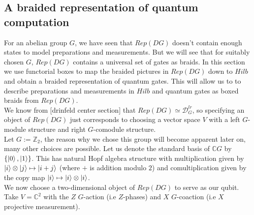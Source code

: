 \documentclass{article}
\begin{document}
\subsection{A braided representation of quantum computation}
For an abelian group $G$, we have seen that $Rep(DG)$ doesn't contain enough states to model preparations and measurements. But we will see that for suitably chosen $G$, $Rep(DG)$ contains a universal set of gates as braids. In this section we use functorial boxes \cite{Mellies06} to map the braided pictures in $Rep(DG)$ down to $Hilb$ and obtain a braided representation of quantum gates. This will allow us to to describe preparations and measurements in $Hilb$ and quantum gates as boxed braids from $Rep(DG)$.\\
We know from [drinfeld center section] that $Rep(DG) \simeq \mathcal{D}_G^{lr}$, so specifying an object of $Rep(DG)$ just corresponds to choosing a vector space $V$ with a left $G$-module structure  and right $G$-comodule structure.\\
Let $G:= \mathbb{Z}_2$, the reason why we chose this group will become apparent later on, many other choices are possible. Let us denote the standard basis of $\mathbb{C}G$ by $\{ \ket{0}, \ket{1}\}$. This has natural Hopf algebra structure with multiplication given by $\ket{i}\otimes \ket{j} \mapsto \ket{i+j}$ (where $+$ is addition modulo $2$) and comultiplication given by the copy map $\ket{i} \mapsto \ket{i}\otimes \ket{i} $.\\
We now choose a two-dimensional object of $Rep(DG)$ to serve as our qubit. Take $V=\mathbb{C}^2$ with the $Z$ $G$-action (i.e $Z$-phases) and $X$ $G$-coaction (i.e $X$ projective measurement).\\





\end{document}
